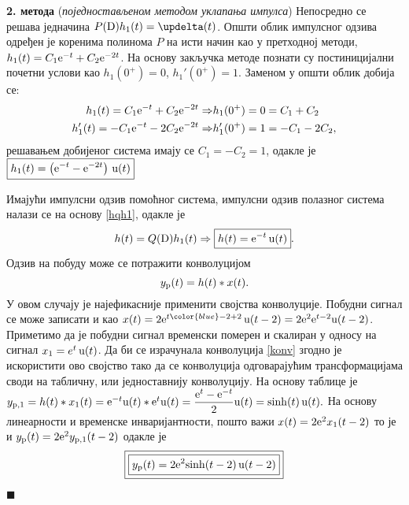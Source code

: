 \vspace*{2mm}
\noindent
\textbf{2. метода} (\textit{поједностављеном
методом уклапања импулса}) Непосредно се решава 
једначина $P({\rm D}) h_1(t) = \updelta(t)$. 
Општи облик импулсног одзива одређен је коренима 
полинома $P$ на исти начин као у претходној 
методи,
$h_1(t) = C_1 {\rm e}^{-t} + C_2 {\rm e}^{-2t}$.
На основу закључка методе познати су постиницијални почетни 
услови као $h_1(0^+) = 0$, $h_1'(0^+) = 1$. 
Заменом у општи облик добија се:
\begin{eqnarray}
h_1(t) = C_1 {\rm e}^{-t} + C_2
{\rm e}^{-2t}  \Rightarrow &
h_1(0^+) = 0 = C_1 + C_2  \\
h_1'(t) = -C_1 {\rm e}^{-t} -2 C_2
{\rm e}^{-2t}  \Rightarrow &
h_1'(0^+) = 1 = -C_1 - 2 C_2,  \\
\end{eqnarray}
решавањем добијеног система имају се $C_1 = -C_2 = 1$,
одакле је $\boxed{
h_1(t) =
\left(
{\rm e}^{-t}  - {\rm e}^{-2t} 
\right) \, {\rm u}(t)
}$

\vspace*{5mm}
\noindent
Имајући импулсни одзив помоћног система, импулсни
одзив полазног система налази се на основу 
\eqref{hqh1}, одакле је 
\begin{equation}
h(t) = Q({\rm D}) h_1(t) \Rightarrow 
\boxed{ h(t) = 
{\rm e}^{-t}
 \,{\rm u}(t) }. \label{eq:hodh1}
\end{equation}
\noindent
Одзив на побуду може се потражити конволуцијом 
\begin{equation}
y_{\rm p}(t) = h(t) \ast x(t). \label{konv}
\end{equation} 
У овом случају
је најефикасније применити својства конволуције. 
Побудни сигнал се може записати и као
$x(t) = 2{\rm e}^{t {\color{blue} - 2 + 2}}
\,{\rm u}(t-2) = 2{\rm e}^2 {\rm e}^{t-2} {\rm u} (t-2)$.
Приметимо да је побудни сигнал временски померен 
и скалиран у односу на сигнал $x_1 = e^{t} \, {\rm u}(t)$. Да би се 
израчунала конволуција \eqref{konv} згодно је 
искористити ово својство тако да се конволуција 
одговарајућим трансформацијама своди на табличну, 
или једноставнију
конволуцију. На основу таблице је 
$y_{\rm p,1} = h(t) \ast x_1(t) = 
{\rm e}^{-t} {\rm u}(t) \ast {\rm e}^{t} {\rm u}(t)
= \dfrac{{\rm e}^t - {\rm e}^{-t} }{2} 
{\rm u}(t) = {\rm sinh}(t) \, {\rm u}(t).
$
На основу линеарности и временске инваријантности, 
пошто важи $x(t) = 
2{\rm e}^2 x_1(t - 2)$ то је и 
$y_{\rm p}(t) = 
2{\rm e}^2 y_{\rm p,1}(t - 2)$ одакле је 
\begin{equation}
\boxed{
\boxed{
y_{\rm p}(t) = 2{\rm e}^2 {\rm sinh}(t-2) \, {\rm u}(t-2)
}
}
\end{equation}
\begin{flushright}
$\blacksquare$
\end{flushright}
